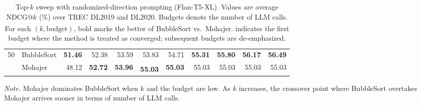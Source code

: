 \documentclass{llmxive}
\providecommand{\conv}[1]{#1\textsuperscript{\textdagger}}
\providecommand{\postconv}[1]{#1}
\providecommand{\best}[1]{\textbf{#1}}
\begin{document}
\begin{table}[!t]
\begin{adjustbox}{max width=\textwidth}
\begin{tabular}{c l rrrrrrrrr}
\midrule
\multirow{2}{*}{50} & BubbleSort
& \best{51.46} & 52.38 & 53.59 & 53.83 & 54.71 & \best{55.31} & \best{55.80} & \best{56.17} & \best{56.49} \\
& Mohajer
& 48.12 & \best{52.72} & \best{53.96} & \conv{\best{55.03}} & \postconv{\best{55.03}} & \postconv{55.03} & \postconv{55.03} & \postconv{55.03} & \postconv{55.03} \\
\bottomrule
\end{tabular}
\end{adjustbox}
\caption{
Top-$k$ sweep with randomized-direction prompting (Flan-T5-XL). Values are average NDCG@$k$ (\%) over TREC DL2019 and DL2020.
Budgets denote the number of LLM calls. For each $(k,\text{budget})$, bold marks the better of BubbleSort vs.\ Mohajer.
\textsuperscript{\textdagger} indicates the first budget where the method is treated as converged; subsequent budgets are de-emphasized.
}
\label{tab:k_budget_sweep_randomized}
\par\vspace{2pt}\footnotesize\noindent\textit{Note.} Mohajer dominates BubbleSort when $k$ and the budget are low. As $k$ increases, the crossover point where BubbleSort overtakes Mohajer arrives sooner in terms of number of LLM calls.
\end{table}
\end{document}
